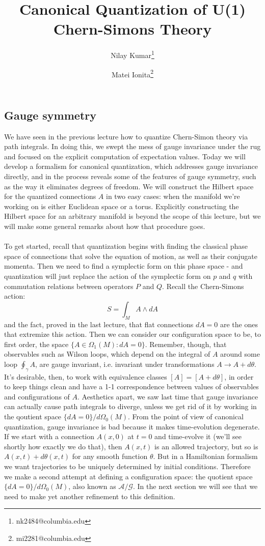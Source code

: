 \documentclass[12pt]{article}
\title{Canonical Quantization of U(1) Chern-Simons Theory}
\author{Nilay Kumar\thanks{nk2484@columbia.edu} }
\author{Matei Ionita\thanks{mi2281@columbia.edu} }
\affil{Columbia University}
\begin{document}
\maketitle

\subsection*{Gauge symmetry}

We have seen in the previous lecture how to quantize Chern-Simon theory via path integrals. In doing this, we swept the mess of gauge invariance under the rug and focused on the explicit computation of expectation values. Today we will develop a formalism for canonical quantization, which addresses gauge invariance directly, and in the process reveals some of the features of gauge symmetry, such as the way it eliminates degrees of freedom. We will construct the Hilbert space for the quantized connections $A$ in two easy cases: when the manifold we're working on is either Euclidean space or a torus. Explicitly constructing the Hilbert space for an arbitrary manifold is beyond the scope of this lecture, but we will make some general remarks about how that procedure goes.
\\
\\
To get started, recall that quantization begins with finding the classical phase space of connections that solve the equation of motion, as well as their conjugate momenta. Then we need to find a symplectic form on this phase space - and quantization will just replace the action of the symplectic form on $p$ and $q$ with commutation relations between operators $P$ and $Q$. Recall the Chern-Simons action:
\[        S = \int_M A\wedge dA       \]
and the fact, proved in the last lecture, that flat connections $dA=0$ are the ones that extremize this action. Then we can consider our configuration space to be, to first order, the space $\{A \in \Omega_1(M): dA=0\}$. Remember, though, that observables such as Wilson loops, which depend on the integral of $A$ around some loop $\oint_{\gamma} A$, are gauge invariant, i.e. invariant under transformations $A \to A + d\theta$. It's desirable, then, to work with equivalence classes $[A] = [A + d\theta]$, in order to keep things clean and have a 1-1 correspondence between values of observables and configurations of $A$. Aesthetics apart, we saw last time that gauge invariance can actually cause path integrals to diverge, unless we get rid of it by working in the qoutient space $\{dA=0\}/d\Omega_0(M)$. From the point of view of canonical quantization, gauge invariance is bad because it makes time-evolution degenerate. If we start with a connection $A(x,0)$ at $t=0$ and time-evolve it (we'll see shortly how exactly we do that), then $A(x,t)$ is an allowed trajectory, but so is $A(x,t) + d\theta(x,t)$ for any smooth function $\theta$. But in a Hamiltonian formalism we want trajectories to be uniquely determined by initial conditions. Therefore we make a second attempt at defining a configuration space: the quotient space $\{dA=0\}/d\Omega_0(M)$, also known as $\mathcal{A}/\mathcal{G}$. In the next section we will see that we need to make yet another refinement to this definition.
\end{document}
